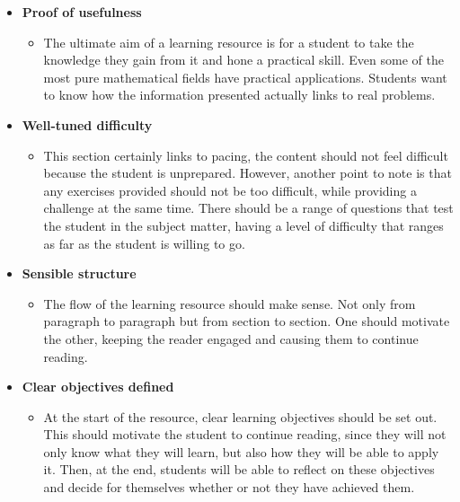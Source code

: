 \begin{itemize}
\begin{itemize}
        \end{itemize}
    \item \textbf{Proof of usefulness}
        \begin{itemize}
            \item The ultimate aim of a learning resource is for a student to take the knowledge they gain from it and hone a practical skill. Even some of the most pure mathematical fields have practical applications. Students want to know how the information presented actually links to real problems. \cite{times-higher-education}
        \end{itemize}
    \item \textbf{Well-tuned difficulty}
        \begin{itemize}
            \item This section certainly links to pacing, the content should not feel difficult because the student is unprepared. However, another point to note is that any exercises provided should not be too difficult, while providing a challenge at the same time. There should be a range of questions that test the student in the subject matter, having a level of difficulty that ranges as far as the student is willing to go.
        \end{itemize}
    \item \textbf{Sensible structure}
        \begin{itemize}
            \item The flow of the learning resource should make sense. Not only from paragraph to paragraph but from section to section. One should motivate the other, keeping the reader engaged and causing them to continue reading.
        \end{itemize}
    \item \textbf{Clear objectives defined}
        \begin{itemize}
            \item At the start of the resource, clear learning objectives should be set out. This should motivate the student to continue reading, since they will not only know what they will learn, but also how they will be able to apply it. Then, at the end, students will be able to reflect on these objectives and decide for themselves whether or not they have achieved them.
        \end{itemize}
\end{itemize}


